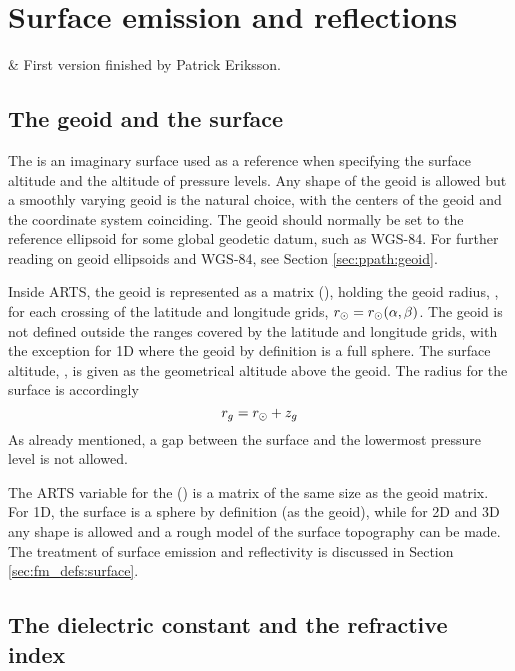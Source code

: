 \chapter{Surface emission and reflections}
 \label{sec:surface}


 & First version finished by Patrick Eriksson. \\
\stophistory


\section{The geoid and the surface}
\label{sec:fm_defs:geoid}

The  is an imaginary surface used as a
reference when specifying the surface altitude and the altitude
of pressure levels. Any shape of the geoid is allowed but a smoothly
varying geoid is the natural choice, with the centers of the geoid and
the coordinate system coinciding. The geoid should normally be set to
the reference ellipsoid for some global geodetic datum, such as
WGS-84. For further reading on geoid ellipsoids and WGS-84, see
Section \ref{sec:ppath:geoid}.

Inside ARTS, the geoid is represented as a matrix
(), holding the geoid radius, \aRds{\odot}, for
each crossing of the latitude and longitude grids,
$r_{\odot}=r_{\odot}(\alpha,\beta)$. The geoid is not defined
outside the ranges covered by the latitude and longitude grids, with
the exception for 1D where the geoid by definition is a full sphere.
The surface altitude, , is given as the geometrical altitude
above the geoid. The radius for the surface is accordingly
\begin{equation}
  r_{g} = r_{\odot} + z_{g}
 \label{eq:fm_defs:zsurface}
\end{equation}
As already mentioned, a gap between the surface and the 
lowermost pressure level is not allowed.

The ARTS variable for the 
() is a matrix of the same size as the geoid
matrix. For 1D, the surface is a sphere by definition (as the geoid),
while for 2D and 3D any shape is allowed and a rough model of the
surface topography can be made. The treatment of surface emission
and reflectivity is discussed in Section \ref{sec:fm_defs:surface}.




\section{The dielectric constant and the refractive index}
 
